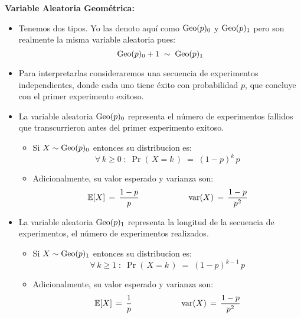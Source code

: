 \documentclass[ 10pt, xcolor = dvipsnames]{beamer}
\begin{document}
\begin{frame}[allowframebreaks]
\frametitle{\insertsection}

\textbf{Variable Aleatoria Geom\'etrica:}
\begin{itemize}
\item Tenemos dos tipos. Yo las denoto aqu\'i como $\text{Geo}(p)_0$ y $\text{Geo}(p)_1$ pero son realmente la misma variable aleatoria pues: 
\[
\text{Geo}(p)_0 + 1 \; \sim \; \text{Geo}(p)_1
\]

\item Para interpretarlas consideraremos una secuencia de experimentos independientes, donde cada uno tiene \'exito con probabilidad $p$, \linebreak que concluye con el primer experimento exitoso. 
\framebreak

\item La variable aleatoria $\text{Geo}(p)_0$ representa el n\'umero de experimentos fallidos que transcurrieron antes del primer experimento exitoso. 
\begin{itemize}
\item Si $X \sim \text{Geo}(p)_0$ entonces su distribucion es: 
\[
\forall \, k \geq 0 \; \colon \;
\Pr( \, X = k \, ) \; = \; (1-p)^k \, p
\]
\item Adicionalmente, su valor esperado y varianza son: 
\[
\mathbb{E}[X] \, = \, \frac{1-p}{p} \qquad \qquad \qquad
\text{var}(X) \, = \, \frac{1-p}{p^2}
\]
\end{itemize}
\framebreak

\item La variable aleatoria $\text{Geo}(p)_1$ representa la longitud de la secuencia de experimentos, \ie el n\'umero de experimentos realizados. 
\begin{itemize}
\item Si $X \sim \text{Geo}(p)_1$ entonces su distribucion es: 
\[
\forall \, k \geq 1 \; \colon \;
\Pr( \, X = k \, ) \; = \; (1-p)^{k-1} \, p
\]
\item Adicionalmente, su valor esperado y varianza son: 
\[
\mathbb{E}[X] \, = \, \frac{1}{p} \qquad \qquad \qquad
\text{var}(X) \, = \, \frac{1-p}{p^2}
\]
\end{itemize}

\end{itemize}

\end{frame}
\end{document}
